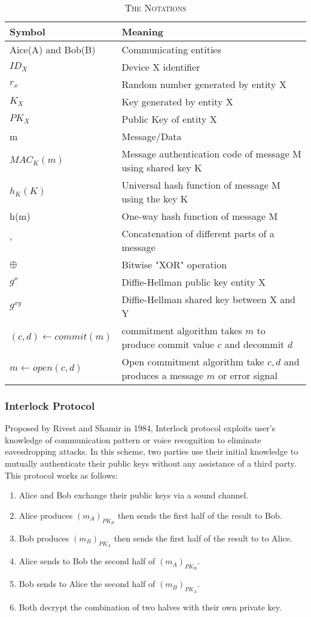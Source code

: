 \begin{table}[ht] 
\centering
\caption{\textsc{The Notations}}
\label{notation}
{\scriptsize
\begin{tabular}{|p{5cm} | p{10cm} |}
\hline
\textbf{Symbol} & \textbf{Meaning} \\ \hline 
Aice(A) and Bob(B) & Communicating entities \\ 
$ID_X$ & Device X identifier \\ 
$r_x$ & Random number generated by entity X \\
$K_X$ & Key generated by entity X \\
$PK_X$ & Public Key of entity X \\ 
m & Message/Data \\ 
$MAC_K(m)$ & Message authentication code of message M using shared key K \\ 
$h_K(K)$ & Universal hash function of message M using the key K \\ 
h(m) & One-way hash function of message M \\ 
$,$ & Concatenation of different parts of a message\\ 
$\oplus$ & Bitwise "XOR" operation \\ 
$g^x$ & Diffie-Hellman public key entity X \\ 
$g^{xy}$ & Diffie-Hellman shared key between X and Y \\ 
$(c,d) \leftarrow commit(m)$ & commitment algorithm takes $m$ to produce commit value $c$ and decommit $d$ \\ 
$m \leftarrow open(c,d)$ & Open commitment algorithm take $c,d$ and produces a message $m$ or error signal \\ \hline 

\end{tabular}
}
\end{table}

\subsubsection{Interlock Protocol}

Proposed by Rivest and Shamir in 1984, Interlock protocol exploits user's knowledge of communication pattern or voice recognition to eliminate eavesdropping attacks. In this scheme, two parties use their initial knowledge to mutually authenticate their public keys without any assistance of a third party. This protocol works as follows:
\begin{enumerate}
\item Alice and Bob exchange their public keys via a sound channel. 
\item Alice produces $(m_A)_{PK_B}$ then sends the first half of the result to Bob. 
\item Bob produces $(m_B)_{PK_A}$ then sends the first half of the result to to Alice. 
\item Alice sends to Bob the second half of $(m_A)_{PK_B}$. 
\item Bob sends to Alice the second half of $(m_B)_{PK_A}$. 
\item Both decrypt the combination of two halves with their own private key. 
\end{enumerate}   

